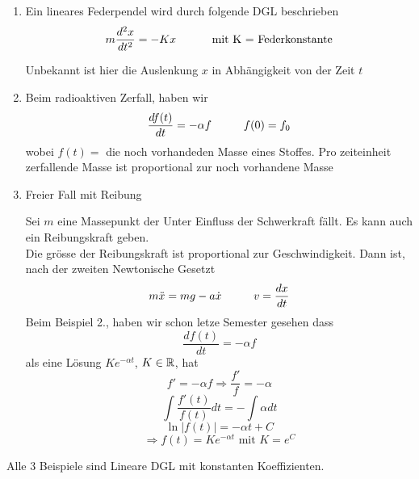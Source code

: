\begin{enumerate}
\item Ein lineares Federpendel wird durch folgende DGL beschrieben \[m\frac{d^2x}{dt^2}=-Kx\text{\hspace{10mm} mit K = Federkonstante}\]
\begin{center}
\end{center}
Unbekannt ist hier die Auslenkung $x$ in Abhängigkeit von der Zeit $t$
\item Beim radioaktiven Zerfall, haben wir \[\frac{df(t)}{dt}=-\alpha f\text{\hspace{10mm}}f(0)=f_0\]
wobei $f(t)=$ die noch vorhandeden Masse eines Stoffes. Pro zeiteinheit zerfallende Masse ist proportional zur noch vorhandene Masse
\item Freier Fall mit Reibung
\begin{center}
\end{center}
Sei $m$ eine Massepunkt der Unter Einfluss der Schwerkraft fällt. Es kann auch ein Reibungskraft geben. \\

Die grösse der Reibungskraft ist proportional zur Geschwindigkeit. Dann ist, nach der zweiten Newtonische Gesetzt \[m\ddot x = mg - a\dot x\text{\hspace{10mm}}v=\frac{dx}{dt}\]
Beim Beispiel 2., haben wir schon letze Semester gesehen dass \[\frac{df(t)}{dt}=-\alpha f\] als eine Lösung $Ke^{-\alpha t}$, $K\in\mathbb{R}$, hat 
\[f'=-\alpha f\Rightarrow \frac{f'}{f}=-\alpha\]
\[\int{\frac{f'(t)}{f(t)}dt}=-\int{\alpha dt}\]
\[\ln\left| f(t)\right|=-\alpha t+C\]
\[\Rightarrow f(t)=Ke^{-\alpha t}\text{ mit }K={e^C}\]
\end{enumerate}
Alle 3 Beispiele sind Lineare DGL mit konstanten Koeffizienten. 
